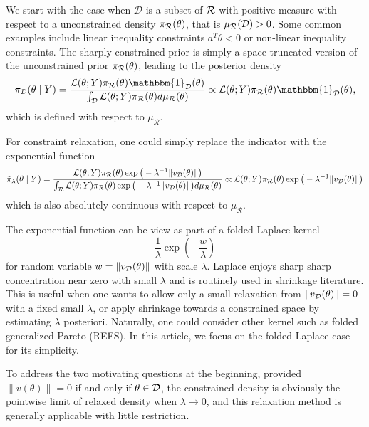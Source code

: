 \documentclass[10pt,fleqn]{article}
\DeclareMathOperator{\1}{\mathbbm{1}} \DeclareMathOperator{\bigO}{\mc O}
\begin{document}
We start with
the case when $\mathcal{D}$ is a subset of $\mathcal{R}$ with positive measure with respect to a unconstrained
density $\pi_{\mathcal{R}}(\theta)$, that is $\mu_\mathcal{R}(\mathcal{D})>0$.
  Some common examples include linear inequality constraints $a^T\theta < 0$ or non-linear inequality constraints.  The sharply constrained prior is simply a space-truncated version of the unconstrained prior 
$\pi_{\mathcal{R}}(\theta)$, leading to the posterior density
$$\pi_\mathcal{D}(\theta\mid Y) = \frac{\mathcal{L}(\theta; Y)
\pi_\mathcal{R}(\theta)\mathbbm{1}_\mathcal{D}(\theta)}{\int_\mathcal{D}
\mathcal{L}(\theta; Y)
\pi_\mathcal{R}(\theta)d\mu_\mathcal{R}(\theta)}\propto \mathcal{L}(\theta;
Y) \pi_\mathcal{R}(\theta)\mathbbm{1}_\mathcal{D}(\theta), $$
which is defined with respect to $\mu_\mathcal{R}$. 

For constraint relaxation, one could simply replace
the indicator  with the exponential function
\begin{equation}
\label{EQ:relaxedDensityPosMeasure}
\tilde{\pi}_\lambda(\theta \mid Y) =
\frac{\mathcal{L}(\theta;
Y)\pi_\mathcal{R}(\theta)\exp\big(-
\lambda^{-1}{\|v_{\mathcal{D}}(\theta)\|}\big)}{\int_{\mathcal{R}}\mathcal{L}(\theta; Y)
\pi_\mathcal{R}(\theta)\exp\big(-{\lambda^{-1}}{\|v_{\mathcal{D}}(\theta)\|}\big)
d\mu_\mathcal{R}(\theta)} \propto
\mathcal{L}(\theta; Y)
\pi_\mathcal{R}(\theta)\exp\big(-{\lambda^{-1}}{\|v_{\mathcal{D}}(\theta)\|}\big)
\end{equation}
which is also absolutely continuous with respect to $\mu_\mathcal{R} $. 

The exponential function can be view as part of a folded Laplace kernel
$$\frac{1}{\lambda}\exp(-\frac{w}{\lambda})$$
 for random variable $w=\|v_{\mathcal{D}}(\theta) \|$ with scale $\lambda$. Laplace enjoys sharp sharp concentration near zero with small $\lambda$ and is routinely used in shrinkage literature. This is useful when one wants to allow only a small relaxation from $\|v_{\mathcal{D}}(\theta) \|=0$ with a fixed small $\lambda$, or apply shrinkage towards a constrained space by estimating $\lambda$ posteriori. Naturally, one could consider other kernel such as folded generalized Pareto (REFS). In this article, we focus on the folded Laplace case for its simplicity.

To address the two motivating questions at the beginning, provided $\|v(\theta)\|=0$ if and only if $\theta\in \mathcal{D}$, the constrained density is obviously the pointwise limit of relaxed density when $\lambda\to 0$, and this relaxation method is generally applicable with little restriction.
   
\end{document}
